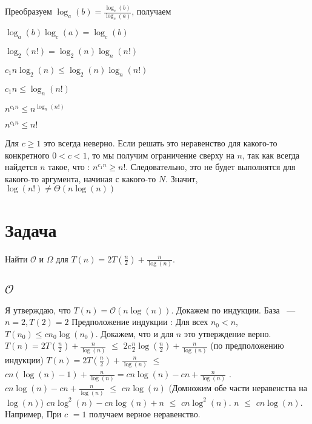 \documentclass{article}
\begin{document}
Преобразуем	$\log_{a}(b) = \frac{\log_{c}(b)}{\log_{c}(a)}$, получаем
\begin{center} $\log_{a}(b)\log_{c}(a) = \log_{c}(b)$
	
$\log_{2}(n!) = \log_{2}(n)\log_{n}(n!)$

$c_{1}n\log_{2}(n) \leq \log_{2}(n)\log_{n}(n!)$

$c_{1}n \leq \log_{n}(n!)$

$n^{c_{1}n} \leq n^{\log_{n}(n!)}$

$n^{c_{1}n} \leq n!$
\end{center}
Для $c \geq 1$ это всегда неверно.
\newline
Если решать это неравенство для какого-то конкретного $  0 < c < 1$, то мы получим ограничение сверху на $n$, так как всегда найдется $n$ такое, что : $n^{c_{1}n} \geq n!$. Следовательно, это не будет выполнятся для какого-то аргумента, начиная с какого-то $N$. Значит, $\log(n!) \neq \Theta(n\log(n))$
\newpage

\section{Задача }

Найти $\mathcal{O}$  и  $\Omega$ для $T(n) = 2T(\frac{n}{2}) + \frac{n}{\log(n)}$.
\subsection{$\mathcal{O}$}
Я утверждаю, что $T(n) = \mathcal{O}(n\log(n))$. Докажем по индукции. База ~--- $n = 2, T(2) = 2$
\newline
Предположение индукции : Для всех $n_{0} < n$, $T(n_{0}) \leq cn_{0}\log(n_{0})$. Докажем, что и для $n$ это утверждение верно.
\newline
$T(n) = 2T(\frac{n}{2}) + \frac{n}{\log(n)}$ $\leq$ $2c\frac{n}{2}\log(\frac{n}{2}) + \frac{n}{\log(n)}$  (по предположению индукции)
\newline
$T(n) = 2T(\frac{n}{2}) + \frac{n}{\log(n)}$ $\leq$ $cn(\log(n) - 1) + \frac{n}{\log(n)} = cn\log(n) - cn + \frac{n}{\log(n)}$ .
\newline
$cn\log(n) - cn + \frac{n}{\log(n)}$ $\leq$ $cn\log(n)$ (Домножим обе части неравенства на $\log(n)$)
$cn\log^{2}(n) - cn\log(n) + n$ $\leq$ $cn\log^{2}(n)$.
\newline
$n$ $\leq$ $cn\log(n)$. Например, При $c$ $= 1$ получаем верное неравенство. %
\end{document}
